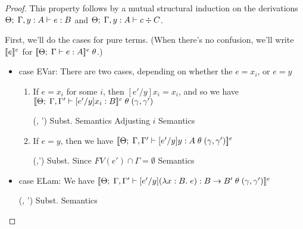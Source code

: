 \begin{proof}
This property follows by a mutual structural induction on the derivations 
${\Theta};\;{\Gamma, y:A} \vdash {e} : {B}$ and ${\Theta};\;{\Gamma, y:A} \vdash {c} \div {C}$. 

First, we'll do the cases for pure terms. (When there's no confusion,
we'll write $[\![{e}]\!]^e$ for
$[\![{{\Theta};\;{\Gamma} \vdash {e} : {A}}]\!]^e\;\theta$.)

\begin{itemize}
\item case EVar: 
  There are two cases, depending on whether the $e = x_i$, or $e = y$

  \begin{enumerate}
  \item If $e = x_i$ for some $i$, then $[e'/y]x_i = x_i$, and so we have
   $[\![{{\Theta};\;{\Gamma, \Gamma'} \vdash {[e'/y]x_i} : {B}}]\!]^e\;\theta\;(\gamma, \gamma')$

    \begin{eqnproof}
      \eline
            {\;\theta\;(\gamma, \gamma')}
            { Subst.}
            { Semantics}
            { Adjusting $i$}
            { Semantics}
    \end{eqnproof}

  \item If $e = y$, then we have $[\![{{\Theta};\;{\Gamma, \Gamma'} \vdash {[e'/y]y} : {A}\;\theta\;(\gamma, \gamma')}]\!]^e$

    \begin{eqnproof}
      \eline
            {\;\theta\;(\gamma,\gamma')}
            { Subst. }
            { Since $FV(e') \cap \Gamma = \emptyset$}
            { Semantics}
    \end{eqnproof}
  \end{enumerate}

\item case ELam: We have $[\![{{\Theta};\;{\Gamma, \Gamma'} \vdash {[e'/y](\lambda x:B.\;e)} : {B \to B'}\;\theta\;(\gamma, \gamma')}]\!]^e$

  \begin{eqnproof}
    \eline
          {\;\theta\;(\gamma, \gamma')}
          {Subst.}
          {Semantics}


\end{eqnproof}
\end{itemize}
\end{proof}
